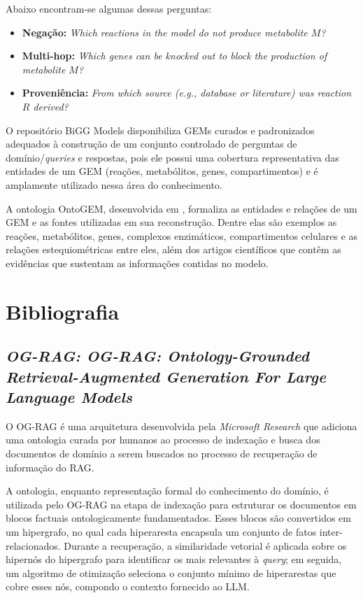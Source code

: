 \documentclass{article}
\begin{document}
 Abaixo encontram-se algumas dessas perguntas:
 \begin{itemize}
 	\item \textbf{Negação:} \textit{Which reactions in the model do not produce metabolite $M$?}
 	\item \textbf{Multi-hop:} \textit{Which genes can be knocked out to block the production of metabolite $M$?}
 	\item \textbf{Proveniência:} \textit{From which source (e.g., database or literature) was reaction $R$ derived?}
 \end{itemize}
 
 
  O repositório BiGG Models \cite{king2016bigg} disponibiliza GEMs curados e padronizados adequados à construção de um conjunto controlado de perguntas de domínio/\textit{queries} e respostas, pois ele possui uma cobertura representativa das entidades de um GEM (reações, metabólitos, genes, compartimentos) e é amplamente utilizado nessa área do conhecimento.
   
 A ontologia OntoGEM, desenvolvida em \cite{souza2025ontogem}, formaliza as entidades e relações de um GEM e as fontes utilizadas em sua reconstrução. Dentre elas  são exemplos as reações, metabólitos, genes, complexos enzimáticos, compartimentos celulares e as relações estequiométricas entre eles, além dos artigos científicos que contêm as evidências que sustentam as informações contidas no modelo. 

\section{Bibliografia}

 \subsection{\textit{OG-RAG: OG-RAG: Ontology-Grounded Retrieval-Augmented Generation For Large Language Models}}
 
O OG-RAG \cite{sharma2025ograg} é uma arquitetura desenvolvida pela \textit{Microsoft Research} que adiciona uma ontologia curada por humanos ao processo de indexação e busca dos documentos de domínio a serem buscados no processo de recuperação de informação do RAG.

A ontologia, enquanto representação formal do conhecimento do domínio, é utilizada pelo OG-RAG na etapa de indexação para estruturar os documentos em blocos factuais ontologicamente fundamentados. Esses blocos são convertidos em um hipergrafo, no qual cada hiperaresta encapsula um conjunto de fatos inter-relacionados. Durante a recuperação, a similaridade vetorial é aplicada sobre os hipernós do hipergrafo para identificar os mais relevantes à \textit{query}; em seguida, um algoritmo
de otimização seleciona o conjunto mínimo de hiperarestas que cobre esses nós, compondo o contexto fornecido ao LLM.
\end{document}
